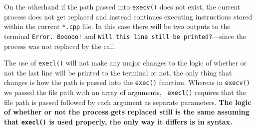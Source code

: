 \documentclass{article}
\begin{document}
\begin{enumerate}
    On the otherhand if the path passed into \texttt{execv()} does not exist, the current process does not get replaced and instead continues executing instructions
    stored within the current \texttt{*.cpp} file. In this case there will be two outputs to the terminal \texttt{Error. Booooo!} and \texttt{Will this line still be
    printed?}---since the process was not replaced by the call.

    The use of \texttt{execl()} will not make any major changes to the logic of whether or not the last line will be printed to the terminal or not, the only thing
    that changes is how the path is passed into the \texttt{exec()} function. Whereas in \texttt{execv()} we passed the file path with an array of arguments, \texttt{
    execl()} requires that the file path is passed followed by each argument as separate parameters. \textbf{The logic of whether or not the process gets replaced still is
    the same assuming that \texttt{execl()} is used properly, the only way it differs is in syntax.}

\end{enumerate}
\end{document}
